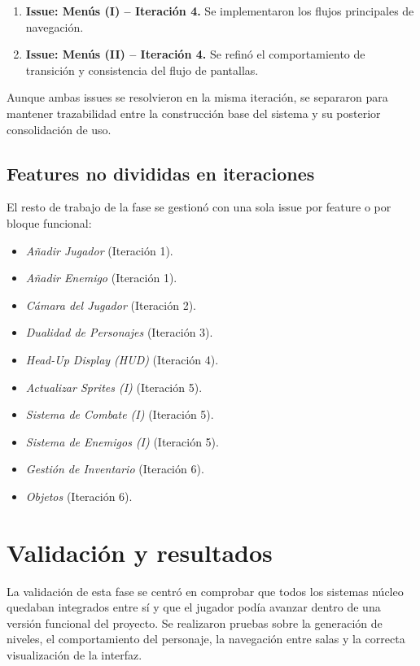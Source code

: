 \begin{enumerate}
\item \textbf{Issue: Menús (I) -- Iteración 4.} Se implementaron los flujos principales de navegación.
\item \textbf{Issue: Menús (II) -- Iteración 4.} Se refinó el comportamiento de transición y consistencia del flujo de pantallas.
\end{enumerate}

Aunque ambas issues se resolvieron en la misma iteración, se separaron para mantener trazabilidad entre
la construcción base del sistema y su posterior consolidación de uso.

\subsection{Features no divididas en iteraciones}
El resto de trabajo de la fase se gestionó con una sola issue por feature o por bloque funcional:

\begin{itemize}
\item \textit{Añadir Jugador} (Iteración 1).
\item \textit{Añadir Enemigo} (Iteración 1).
\item \textit{Cámara del Jugador} (Iteración 2).
\item \textit{Dualidad de Personajes} (Iteración 3).
\item \textit{Head-Up Display (HUD)} (Iteración 4).
\item \textit{Actualizar Sprites (I)} (Iteración 5).
\item \textit{Sistema de Combate (I)} (Iteración 5).
\item \textit{Sistema de Enemigos (I)} (Iteración 5).
\item \textit{Gestión de Inventario} (Iteración 6).
\item \textit{Objetos} (Iteración 6).
\end{itemize}

\section{Validación y resultados}
La validación de esta fase se centró en comprobar que todos los sistemas núcleo quedaban integrados
entre sí y que el jugador podía avanzar dentro de una versión funcional del proyecto. Se realizaron
pruebas sobre la generación de niveles, el comportamiento del personaje, la navegación entre salas
y la correcta visualización de la interfaz.

